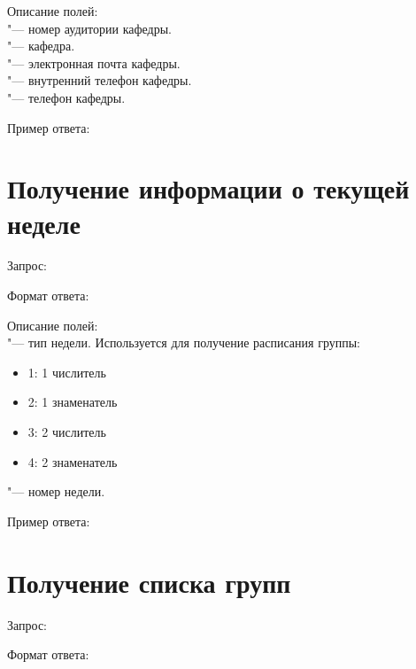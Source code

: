 Описание полей:\\
 "--- номер аудитории кафедры.\\
 "--- кафедра.\\
 "--- электронная почта кафедры.\\
 "--- внутренний телефон кафедры.\\
 "--- телефон кафедры.

Пример ответа:
\begin{listing}[H]
\end{listing}
\vspace{-0.75cm}

\section{Получение информации о текущей неделе}
\label{sec:faq}

Запрос: 

Формат ответа:
\begin{listing}[H]
\end{listing}
\vspace{-0.75cm}

Описание полей:\\
 "--- тип недели.
Используется для получение расписания группы:
\begin{itemize}
  \item 1: 1 числитель
  \item 2: 1 знаменатель
  \item 3: 2 числитель
  \item 4: 2 знаменатель
\end{itemize}
 "--- номер недели.

Пример ответа:
\begin{listing}[H]
\end{listing}
\vspace{-0.75cm}

\section{Получение списка групп}
\label{sec:groups}

Запрос: 

Формат ответа:
\begin{listing}[H]
\end{listing}
\vspace{-0.75cm}

